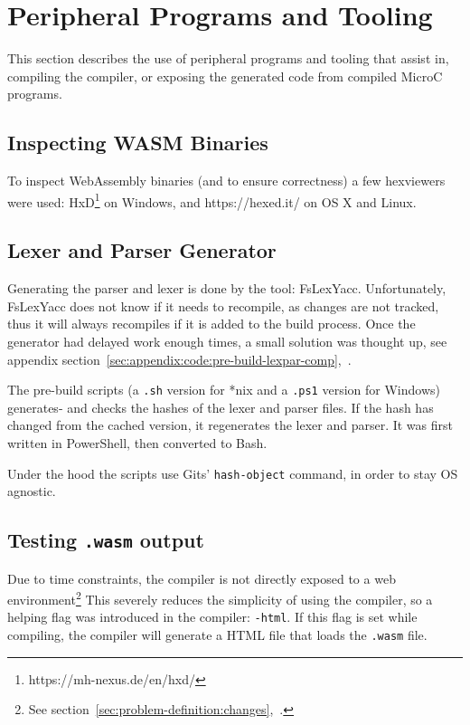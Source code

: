 \documentclass[a4paper]{article}
\begin{document}
\section{Peripheral Programs and Tooling}
\label{sec:peripherals}
This section describes the use of peripheral programs and tooling that assist in, compiling the compiler, or exposing the generated code from compiled MicroC programs.

\subsection{Inspecting WASM Binaries}
\label{sec:peripherals:inspecting-wasm}
To inspect WebAssembly binaries (and to ensure correctness) a few hexviewers were used: HxD\footnote{https://mh-nexus.de/en/hxd/} on Windows, and https://hexed.it/ on OS X and Linux.

\subsection{Lexer and Parser Generator}
\label{sec:peripherals:lexpargen}
Generating the parser and lexer is done by the tool: FsLexYacc. Unfortunately, FsLexYacc does not know if it needs to recompile, as changes are not tracked, thus it will always recompiles if it is added to the build process. Once the generator had delayed work enough times, a small solution was thought up, see appendix section~\ref{sec:appendix:code:pre-build-lexpar-comp},~.

The pre-build scripts (a \texttt{.sh} version for *nix and a \texttt{.ps1} version for Windows) generates- and checks the hashes of the lexer and parser files. If the hash has changed from the cached version, it regenerates the lexer and parser. It was first written in PowerShell, then converted to Bash.

Under the hood the scripts use Gits' \texttt{hash-object} command, in order to stay OS agnostic.

\subsection{Testing \texttt{.wasm} output}
\label{sec:peripherals:testing-wasm}
Due to time constraints, the compiler is not directly exposed to a web environment\footnote{See section~\ref{sec:problem-definition:changes},~.} This severely reduces the simplicity of using the compiler, so a helping flag was introduced in the compiler: \texttt{-html}. If this flag is set while compiling, the compiler will generate a HTML file that loads the \texttt{.wasm} file.
\end{document}
